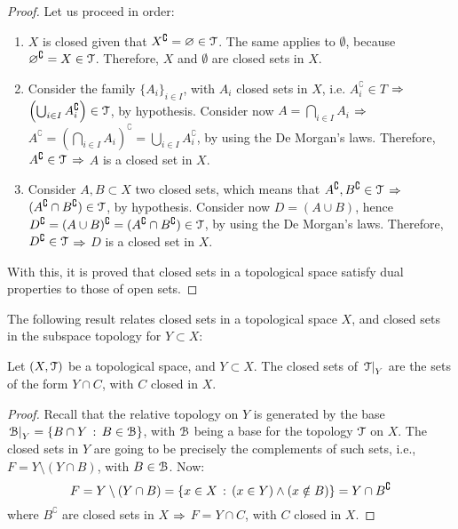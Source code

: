 \begin{proof}
	Let us proceed in order:
	\begin{enumerate}
		\item $X$ is closed given that $X^\complement=\varnothing\in \EuScript{T}$. The same applies to $\emptyset$, because $\varnothing^\complement=X\in \EuScript{T}$.
		Therefore, $X$ and $\emptyset$ are closed sets in $X$.
		\item Consider the family $\{A_i\}_{i\in I}$, with $A_i$ closed sets in $X$, i.e. $A_i^\complement\in T$ $\Rightarrow$ $\left(\bigcup_{i\in I}A_i^\complement\right)\in \EuScript{T}$, by hypothesis. Consider now $A=\bigcap_{i\in I}A_i$ $\Rightarrow$ $A^\complement = \left(\bigcap_{i\in I} A_i \right)^\complement=\bigcup_{i\in I}A_i^\complement$, by using the De Morgan's laws. Therefore, $A^\complement\in \EuScript{T}$ $\Rightarrow$ $A$ is a closed set in $X$.
		\item Consider $A,B\subset X$ two closed sets, which means that $A^\complement, B^\complement\in \EuScript{T}$ $\Rightarrow$ $(A^\complement\cap B^\complement)\in \EuScript{T}$, by hypothesis. Consider now $D=(A\cup B)$, hence $D^\complement = (A\cup B)^\complement = (A^\complement \cap B^\complement)\in \EuScript{T}$, by using the De Morgan's laws. Therefore, $D^\complement\in \EuScript{T}$ $\Rightarrow$ $D$ is a closed set in $X$.
	\end{enumerate}
	With this, it is proved that closed sets in a topological space satisfy dual properties to those of open sets.
\end{proof}

The following result relates closed sets in a topological space $X$, and closed sets in the subspace topology for $Y\subset X$:

\begin{lemma}
	Let $(X, \EuScript{T})$ be a topological space, and $Y\subset X$. The closed sets of $\left.\EuScript{T}\right|_{Y}$ are the sets of the form $Y\cap C$, with $C$ closed in $X$.
\end{lemma}
\begin{proof}
	Recall that the relative topology on $Y$ is generated by the base $\left.\EuScript{B}\right|_{Y}=\left\{B\cap Y\,:\,B\in\EuScript{B}\right\}$, with $\EuScript{B}$ being a base for the topology $\EuScript{T}$ on $X$. The closed sets in $Y$ are going to be precisely the complements of such sets, i.e., $F=Y\setminus(Y\cap B)$, with $B\in\EuScript{B}$. Now:
	$$
	F=Y\setminus(Y\cap B)=\left\{x\in X\,:\,(x\in Y)\land(x\notin B)\right\}=Y\cap B^\complement
	$$
	where $B^\complement$ are closed sets in $X$ $\Rightarrow$ $F=Y\cap C$, with $C$ closed in $X$.
\end{proof}